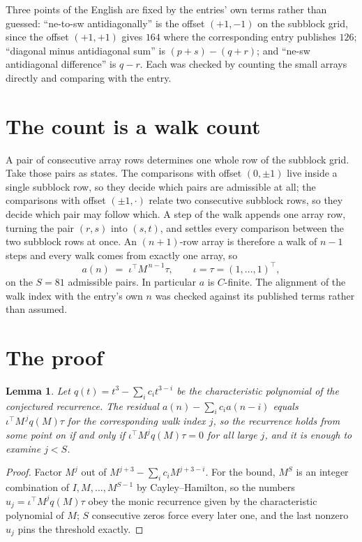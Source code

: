 \documentclass[11pt,a4paper]{article}
\theoremstyle{plain}
\newtheorem{lemma}[theorem]{Lemma}
\theoremstyle{definition}
\begin{document}
Three points of the English are fixed by the entries' own terms rather than guessed:
``ne-to-sw antidiagonally'' is the offset $(+1,-1)$ on the subblock grid, since the offset
$(+1,+1)$ gives $164$ where the corresponding entry publishes $126$; ``diagonal minus
antidiagonal sum'' is $(p+s)-(q+r)$; and ``ne-sw antidiagonal difference'' is $q-r$. Each was
checked by counting the small arrays directly and comparing with the entry.

\section{The count is a walk count}

A pair of consecutive array rows determines one whole row of the subblock grid. Take those
pairs as states. The comparisons with offset $(0,\pm1)$ live inside a single subblock row, so
they decide which pairs are admissible at all; the comparisons with offset $(\pm1,\cdot)$
relate two consecutive subblock rows, so they decide which pair may follow which. A step of the
walk appends one array row, turning the pair $(r,s)$ into $(s,t)$, and settles every comparison
between the two subblock rows at once. An $(n+1)$-row array is therefore a walk of $n-1$ steps
and every walk comes from exactly one array, so
\[
a(n)\;=\;\iota^{\!\top}M^{\,n-1}\tau,\qquad \iota=\tau=(1,\dots,1)^{\!\top},
\]
on the $S=81$ admissible pairs. In particular $a$ is $C$-finite. The alignment of the walk
index with the entry's own $n$ was checked against its published terms rather than assumed.

\section{The proof}

\begin{lemma}\label{lem:crit}
Let $q(t)=t^{3}-\sum_i c_it^{3-i}$ be the characteristic polynomial of the
conjectured recurrence. The residual $a(n)-\sum_ic_ia(n-i)$ equals
$\iota^{\!\top}M^{\,j}q(M)\tau$ for the corresponding walk index $j$, so the recurrence
holds from some point on if and only if $\iota^{\!\top}M^{j}q(M)\tau=0$ for all large $j$,
and it is enough to examine $j<S$.
\end{lemma}

\begin{proof}
Factor $M^{j}$ out of $M^{j+3}-\sum_ic_iM^{j+3-i}$. For the bound, $M^{S}$
is an integer combination of $I,M,\dots,M^{S-1}$ by Cayley--Hamilton, so the numbers
$u_j=\iota^{\!\top}M^{j}q(M)\tau$ obey the monic recurrence given by the characteristic
polynomial of $M$; $S$ consecutive zeros force every later one, and the last nonzero $u_j$
pins the threshold exactly.
\end{proof}
\end{document}
